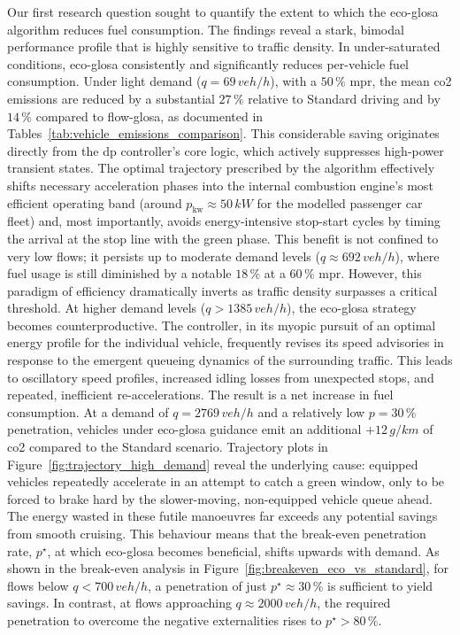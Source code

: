 Our first research question sought to quantify the extent to which the \ac{eco-glosa} algorithm reduces fuel consumption. The findings reveal a stark, bimodal performance profile that is highly sensitive to traffic density.
\mynewline
In under-saturated conditions, \ac{eco-glosa} consistently and significantly reduces per-vehicle fuel consumption. Under light demand ($q=69\,\unit{veh/h}$), with a $50\,\%$ \ac{mpr}, the mean \ac{co2} emissions are reduced by a substantial $27\,\%$ relative to Standard driving and by $14\,\%$ compared to \ac{flow-glosa}, as documented in Tables~\ref{tab:vehicle_emissions_comparison}. This considerable saving originates directly from the \ac{dp} controller's core logic, which actively suppresses high-power transient states. The optimal trajectory prescribed by the algorithm effectively shifts necessary acceleration phases into the internal combustion engine's most efficient operating band (around $p_\mathrm{kw}\approx50\,\unit{kW}$ for the modelled passenger car fleet) and, most importantly, avoids energy-intensive stop-start cycles by timing the arrival at the stop line with the green phase. This benefit is not confined to very low flows; it persists up to moderate demand levels ($q\approx692\,\unit{veh/h}$), where fuel usage is still diminished by a notable $18\,\%$ at a $60\,\%$ \ac{mpr}.
\mynewline
However, this paradigm of efficiency dramatically inverts as traffic density surpasses a critical threshold. At higher demand levels ($q > 1385\,\unit{veh/h}$), the \ac{eco-glosa} strategy becomes counterproductive. The controller, in its myopic pursuit of an optimal energy profile for the individual vehicle, frequently revises its speed advisories in response to the emergent queueing dynamics of the surrounding traffic. This leads to oscillatory speed profiles, increased idling losses from unexpected stops, and repeated, inefficient re-accelerations. The result is a net increase in fuel consumption. At a demand of $q=2769\,\unit{veh/h}$ and a relatively low $p=30\,\%$ penetration, vehicles under \ac{eco-glosa} guidance emit an additional $+12\,\unit{g/km}$ of \ac{co2} compared to the Standard scenario. Trajectory plots in Figure~\ref{fig:trajectory_high_demand} reveal the underlying cause: equipped vehicles repeatedly accelerate in an attempt to catch a green window, only to be forced to brake hard by the slower-moving, non-equipped vehicle queue ahead. The energy wasted in these futile manoeuvres far exceeds any potential savings from smooth cruising.
\mynewline
This behaviour means that the break-even penetration rate, $p^\star$, at which \ac{eco-glosa} becomes beneficial, shifts upwards with demand. As shown in the break-even analysis in Figure~\ref{fig:breakeven_eco_vs_standard}, for flows below $q < 700\,\unit{veh/h}$, a penetration of just $p^\star\approx30\,\%$ is sufficient to yield savings. In contrast, at flows approaching $q \approx 2000\,\unit{veh/h}$, the required penetration to overcome the negative externalities rises to $p^\star > 80\,\%$.

